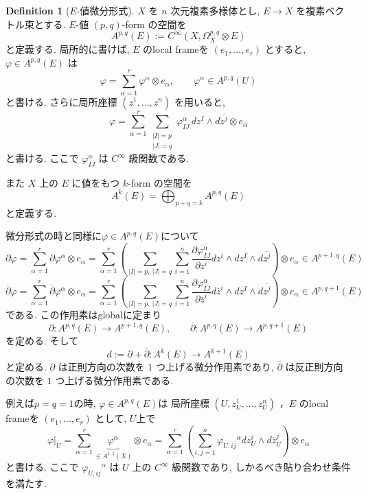 \documentclass[dvipdfmx,a4paper,11pt]{article} %
\theoremstyle{definition}
\newtheorem{defn}[thm]{Definition}
\theoremstyle{remark}
\numberwithin{equation}{section}
\begin{document}
\begin{defn}[\(E\)-値微分形式]
\(X\) を \(n\) 次元複素多様体とし, \(E\to X\) を複素ベクトル束とする. \(E\)-値 \((p,q)\)-form の空間を
\[
A^{p,q}(E):=C^\infty(X,\Omega_X^{p,q}\otimes E)
\]
と定義する. 局所的に書けば, \(E\) のlocal frameを \((e_1,\ldots,e_r)\) とすると, \(\varphi\in A^{p,q}(E)\) は
\[
\varphi=\sum_{\alpha=1}^r \varphi^\alpha\otimes e_\alpha,\qquad \varphi^\alpha\in A^{p,q}(U)
\]
と書ける. さらに局所座標 \((z^1,\ldots,z^n)\) を用いると,
\[
\varphi=\sum_{\alpha=1}^r\sum_{\substack{|I|=p\\ |J|=q}}\varphi^\alpha_{I\overline{J}}\,dz^I\wedge d\overline{z^j}\otimes e_\alpha
\]
と書ける. ここで \(\varphi^\alpha_{I\overline{J}}\) は \(C^\infty\) 級関数である.

また \(X\) 上の \(E\) に値をもつ \(k\)-form の空間を
\[
A^k(E)=\bigoplus_{p+q=k}A^{p,q}(E)
\]
と定義する.

微分形式の時と同様に\(\varphi\in A^{p,q}(E)\)について
\[
\partial\varphi=
\sum_{\alpha=1}^r \partial\varphi^\alpha\otimes e_\alpha
=
\sum_{\alpha=1}^r\left(\sum_{|I|=p,\ |J|=q}\sum_{i=1}^n
\frac{\partial \varphi^{\alpha}_{I\overline{J}}}{\partial z^i}
dz^i\wedge dz^I\wedge d\overline{z^j}
\right)\otimes e_\alpha
\in A^{p+1, q}(E)
\]
\[
\overline{\partial}\varphi=
\sum_{\alpha=1}^r \overline{\partial}\varphi^\alpha\otimes e_\alpha
=
\sum_{\alpha=1}^r\left(\sum_{|I|=p,\ |J|=q}\sum_{i=1}^n
\frac{\partial \varphi^{\alpha}_{I\overline{J}}}{\partial \overline{z}^i}
d\overline{z}^i\wedge dz^I\wedge d\overline{z^j} 
\right)
\otimes e_\alpha \in A^{p, q+1}(E)
\]
である. 
この作用素はglobalに定まり
\[
\partial\colon A^{p,q}(E)\longrightarrow A^{p+1,q}(E),\qquad
\overline{\partial}\colon A^{p,q}(E)\longrightarrow A^{p,q+1}(E)
\]
を定める. 
そして
\[
d:=\partial+\overline{\partial} \colon A^k(E)\longrightarrow A^{k+1}(E)
\]
と定める. 
\(\partial\) は正則方向の次数を \(1\) つ上げる微分作用素であり, \(\overline{\partial}\) は反正則方向の次数を \(1\) つ上げる微分作用素である.
\end{defn}

例えば$p=q=1$の時, $\varphi \in A^{p,q}(E)$は
局所座標 \((U,z_U^1,\ldots,z_U^n)\) ，\(E\) のlocal frameを \((e_1,\ldots,e_r)\) 
として, $U$上で
\[
\varphi|_{U}
=
\sum_{\alpha=1}^r
\underbrace{\varphi^\alpha}_{\in A^{1,1}(X)}\otimes e_\alpha
=
\sum_{\alpha=1}^r
\left(
\sum_{i,j=1}^n
{\varphi_{U,i\overline{j}}}^{\alpha}
dz_U^i\wedge d\overline{z}_U^j 
\right)
\otimes e_\alpha
\]
と書ける. ここで \({\varphi_{U,i\overline{j}}}^{\alpha}\) は \(U\) 上の \(C^\infty\) 級関数であり, しかるべき貼り合わせ条件を満たす. 
\end{document}
